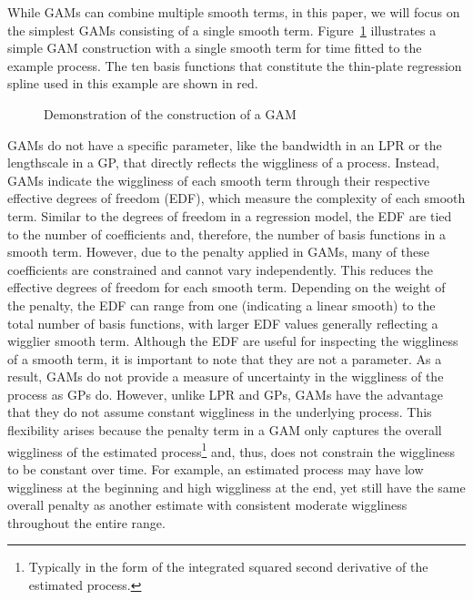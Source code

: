 \documentclass[man, floatsintext]{apa7}
\begin{document}
While GAMs can combine multiple smooth terms, in this paper, we will focus on
the simplest GAMs consisting of a single smooth term. Figure~\ref{fig:gam_dem}
illustrates a simple GAM construction with a single smooth term for time
fitted to the example process. The ten basis functions that constitute the
thin-plate regression spline used in this example are shown in red.

\begin{figure}[!t]
  \caption{Demonstration of the construction of a GAM}
  \label{fig:gam_dem}
\end{figure}

GAMs do not have a specific parameter, like the bandwidth in an LPR or the
lengthscale in a GP, that directly reflects the wiggliness of a process.
Instead, GAMs indicate the wiggliness of each smooth term through their
respective effective degrees of freedom (EDF), which measure the complexity of
each smooth term. Similar to the degrees of freedom in a regression model, the
EDF are tied to the number of coefficients and, therefore, the number of basis
functions in a smooth term. However, due to the penalty applied in GAMs, many
of these coefficients are constrained and cannot vary independently. This
reduces the effective degrees of freedom for each smooth term. Depending on the
weight of the penalty, the EDF can range from one (indicating a linear smooth)
to the total number of basis functions, with larger EDF values generally
reflecting a wigglier smooth term. Although the EDF are useful for inspecting
the wiggliness of a smooth term, it is important to note that they are not a
parameter. As a result, GAMs do not provide a measure of uncertainty in the
wiggliness of the process as GPs do. However, unlike LPR and GPs, GAMs have the
advantage that they do not assume constant wiggliness in the underlying
process. This flexibility arises because the penalty term in a GAM only
captures the overall wiggliness of the estimated process\footnote{Typically in
  the form of the integrated squared second derivative of the estimated
  process.}
and, thus, does not constrain the wiggliness to be constant over time. For
example, an estimated process may have low wiggliness at the beginning and high
wiggliness at the end, yet still have the same overall penalty as another
estimate with consistent moderate wiggliness throughout the entire range.
\end{document}
